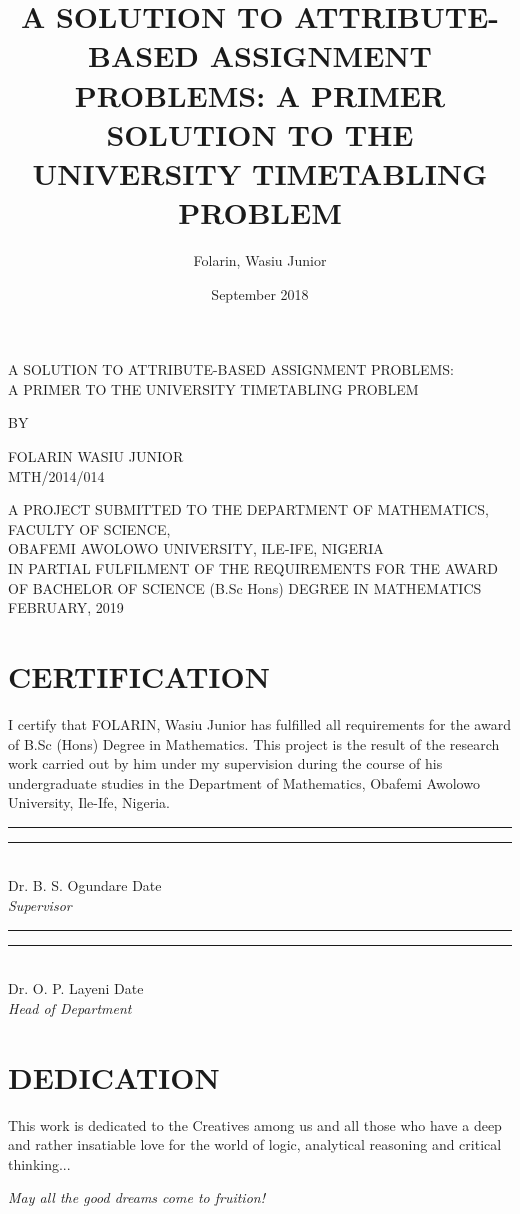\documentclass[a4paper,openany]{book}
\title{A SOLUTION TO ATTRIBUTE-BASED ASSIGNMENT PROBLEMS: A PRIMER SOLUTION TO THE UNIVERSITY TIMETABLING PROBLEM}
\date{September 2018}
\author{Folarin, Wasiu Junior}
\begin{document}
    \normalsize
	\frontmatter
	\begin{titlepage}
		\begin{center}
			A SOLUTION TO ATTRIBUTE-BASED ASSIGNMENT PROBLEMS:\\
			A PRIMER TO THE UNIVERSITY TIMETABLING PROBLEM
		\end{center}
		\vfill
		\begin{center}
			BY
		\end{center}
		\vfill
		\begin{center}
			FOLARIN WASIU JUNIOR\\[0.25in]
			MTH/2014/014
		\end{center}
		\vfill
		\begin{center}
			A PROJECT SUBMITTED TO THE DEPARTMENT OF MATHEMATICS, FACULTY OF SCIENCE,\\
			OBAFEMI AWOLOWO UNIVERSITY, ILE-IFE, NIGERIA\\
			IN PARTIAL FULFILMENT OF THE REQUIREMENTS FOR THE AWARD OF 
			BACHELOR OF SCIENCE (B.Sc Hons) DEGREE IN MATHEMATICS\\ \bigskip
			FEBRUARY, 2019
		\end{center}
	\end{titlepage}
	\chapter[CERTIFICATION]{\centering CERTIFICATION}
	I certify that FOLARIN, Wasiu Junior has fulfilled all requirements for the award of B.Sc (Hons) Degree in Mathematics. This project is the result of the research work carried out by him under my supervision during the course of his undergraduate studies in the Department of Mathematics, Obafemi Awolowo University, Ile-Ife, Nigeria.
	\\[1in]
	\rule{1.5in}{0.1pt} \hfill \rule{1in}{0.4pt}
	\\[2ex]
	Dr. B. S. Ogundare \hfill Date \hspace{4ex}
	\\[1ex]
	\textit{Supervisor}
	\\[1.5in]
	\rule{1.5in}{0.1pt} \hfill \rule{1in}{0.4pt}
	\\[2ex]
	Dr. O. P. Layeni \hfill Date \hspace{4ex}
	\\[1ex]
	\textit{Head of Department}
	
	\chapter[DEDICATION]{ \centering DEDICATION}
		This work is dedicated to the Creatives among us and all those who have a deep and rather insatiable love for the world of logic, analytical reasoning and critical thinking...
		\begin{center}
			\textit{May all the good dreams come to fruition!}
		\end{center}
\end{document}
